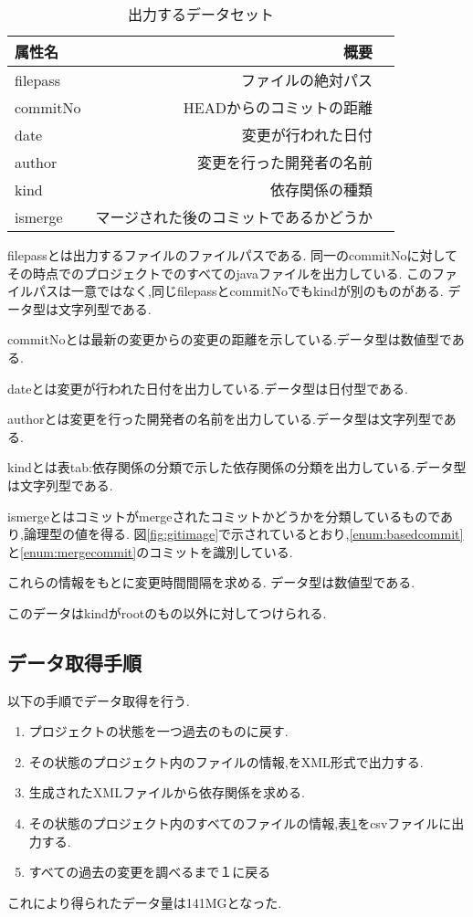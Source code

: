 \documentclass{fose2016}           %
\begin{document}
\begin{table}[htb]
\caption{出力するデータセット}
\begin{tabular}{|l|r|r|} \hline
属性名 & 概要 \\ \hline
filepass & ファイルの絶対パス \\ \hline
commitNo & HEADからのコミットの距離 \\ \hline
date & 変更が行われた日付 \\ \hline
author & 変更を行った開発者の名前 \\ \hline
kind & 依存関係の種類 \\ \hline
ismerge & マージされた後のコミットであるかどうか \\ \hline
\end{tabular}
\label{tab:初期データセット}
\end{table}

filepassとは出力するファイルのファイルパスである.
同一のcommitNoに対してその時点でのプロジェクトでのすべてのjavaファイルを出力している.
このファイルパスは一意ではなく,同じfilepassとcommitNoでもkindが別のものがある.
データ型は文字列型である.

commitNoとは最新の変更からの変更の距離を示している.データ型は数値型である.

dateとは変更が行われた日付を出力している.データ型は日付型である.

authorとは変更を行った開発者の名前を出力している.データ型は文字列型である.

kindとは表{tab:依存関係の分類}で示した依存関係の分類を出力している.データ型は文字列型である.

ismergeとはコミットがmergeされたコミットかどうかを分類しているものであり,論理型の値を得る.
図\ref{fig:gitimage}で示されているとおり,\ref{enum:basedcommit}と\ref{enum:mergecommit}のコミットを識別している.


これらの情報をもとに変更時間間隔を求める.
データ型は数値型である.

このデータはkindがrootのもの以外に対してつけられる.


\subsection{データ取得手順}
以下の手順でデータ取得を行う.
\begin{enumerate}
\item プロジェクトの状態を一つ過去のものに戻す.
\item その状態のプロジェクト内のファイルの情報,をXML形式で出力する.
\item 生成されたXMLファイルから依存関係を求める.
\item その状態のプロジェクト内のすべてのファイルの情報,表\ref{tab:初期データセット}をcsvファイルに出力する.
\item すべての過去の変更を調べるまで１に戻る
\end{enumerate}
これにより得られたデータ量は141MGとなった.
\end{document}

